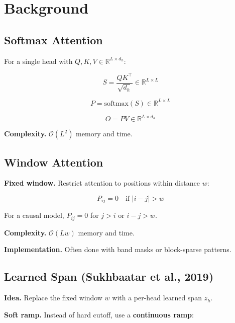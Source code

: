 
\section{Background}

\subsection{Softmax Attention}

For a single head with $Q, K, V \in \mathbb{R}^{L \times d_h}$:

\begin{equation}
S = \frac{Q K^\top}{\sqrt{d_h}} \in \mathbb{R}^{L \times L}
\end{equation}

\begin{equation}
P = \text{softmax}(S) \in \mathbb{R}^{L \times L}
\end{equation}

\begin{equation}
O = P V \in \mathbb{R}^{L \times d_h}
\end{equation}

\textbf{Complexity.} $\mathcal{O}(L^2)$ memory and time.

\subsection{Window Attention}

\textbf{Fixed window.} Restrict attention to positions within distance $w$:

\begin{equation}
P_{ij} = 0 \quad \text{if } |i - j| > w
\end{equation}

For a causal model, $P_{ij} = 0$ for $j > i$ or $i - j > w$.

\textbf{Complexity.} $\mathcal{O}(L w)$ memory and time.

\textbf{Implementation.} Often done with band masks or block-sparse patterns.

\subsection{Learned Span (Sukhbaatar et al., 2019)}

\textbf{Idea.} Replace the fixed window $w$ with a per-head learned span $z_h$.

\textbf{Soft ramp.} Instead of hard cutoff, use a \textbf{continuous ramp}:

